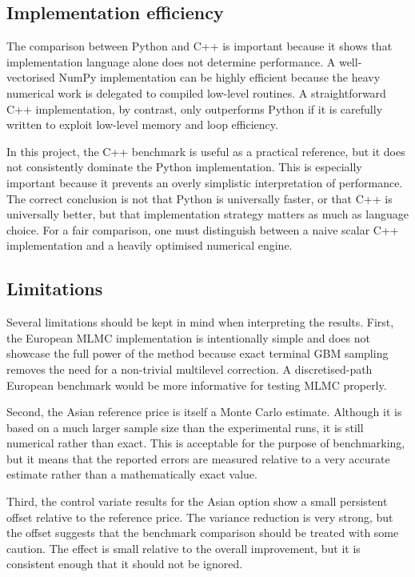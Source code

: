 \documentclass[11pt]{article}
\begin{document}
\subsection{Implementation efficiency}

The comparison between Python and C++ is important because it shows that implementation language alone does not determine performance. A well-vectorised NumPy implementation can be highly efficient because the heavy numerical work is delegated to compiled low-level routines. A straightforward C++ implementation, by contrast, only outperforms Python if it is carefully written to exploit low-level memory and loop efficiency.

In this project, the C++ benchmark is useful as a practical reference, but it does not consistently dominate the Python implementation. This is especially important because it prevents an overly simplistic interpretation of performance. The correct conclusion is not that Python is universally faster, or that C++ is universally better, but that implementation strategy matters as much as language choice. For a fair comparison, one must distinguish between a naive scalar C++ implementation and a heavily optimised numerical engine.

\subsection{Limitations}

Several limitations should be kept in mind when interpreting the results. First, the European MLMC implementation is intentionally simple and does not showcase the full power of the method because exact terminal GBM sampling removes the need for a non-trivial multilevel correction. A discretised-path European benchmark would be more informative for testing MLMC properly.

Second, the Asian reference price is itself a Monte Carlo estimate. Although it is based on a much larger sample size than the experimental runs, it is still numerical rather than exact. This is acceptable for the purpose of benchmarking, but it means that the reported errors are measured relative to a very accurate estimate rather than a mathematically exact value.

Third, the control variate results for the Asian option show a small persistent offset relative to the reference price. The variance reduction is very strong, but the offset suggests that the benchmark comparison should be treated with some caution. The effect is small relative to the overall improvement, but it is consistent enough that it should not be ignored.
\end{document}
